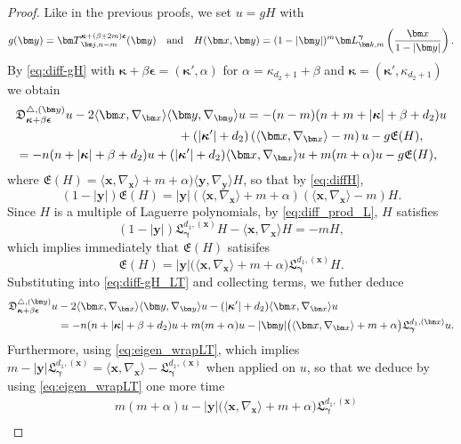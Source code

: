\documentclass{amsart}
\theoremstyle{remark}
\def\la{{\langle}}
\def\ra{{\rangle}}
\def\fD{{\mathfrak D}}
\def\fE{{\mathfrak E}}
\def\fL{{\mathfrak L}}
\def\a{{\alpha}}
\def\b{{\beta}}
\def\k{{\kappa}}
\def\la{{\langle}}
\def\ra{{\rangle}}
\def\xb{{\bm x}}
\def\yb{{\bm y}}
\def\Tb{{\bm T}}
\def\bep{{\boldsymbol{\epsilon}}}
\def\bg{{\boldsymbol{\gamma}}}
\def\bk{{\boldsymbol{\kappa}}}
\begin{document}
\begin{proof}
Like in the previous proofs, we set $u  = g H$ with
$$
  g(\yb) = \Tb_{\bm j, n-m}^{\bk+(\b+2m)\bep}(\bm y) \quad \hbox{and} \quad H(\xb,\yb) =(1- |\bm y|)^m 
      \bm L_{\bm k, m}^{\bg} \left(\frac{\bm x}{1- |\bm y|}\right).
$$
By \eqref{eq:diff-gH} with $\bk+\b \bep = (\bk', \a)$ for $\a = \k_{d_2+1} + \b$ and $\bk = (\bk', \k_{d_2+1})$ we obtain 
\begin{align} \label{eq:diff-gH_LT}
& \fD_{\bk+\b \bep}^{\triangle, (\yb)} u  -  2 \la \bm x, \nabla_{\bm x} \ra  \la \bm y, \nabla_{\bm y} \ra u 
 =  - (n-m) (n+ m + |\bk|+ \b +d_2) u \\
& \qquad \qquad\qquad\qquad\qquad\qquad\quad + (|\bk'|+ d_2)\left (\la \bm x, \nabla_{\bm x} \ra -m\right )u  - g  \fE(H), \notag \\
& =  - n (n + |\bk|+ \b +d_2) u + (|\bk'|+ d_2) \la \bm x, \nabla_{\bm x} \ra u + m(m+\a)u  - g  \fE(H), \notag 
\end{align}
where $\fE(H) = \la \bm x, \nabla_{\bm x} \ra +m + \a) \la \bm y, \nabla_{\bm y} \ra H$, so that by \eqref{eq:diffH},
$$
  (1-|\yb|)\fE(H) = |\yb| (\la \bm x, \nabla_{\bm x} \ra +m + \a) (\la \xb, \nabla_{\bm x} \ra-m)  H.
$$
Since $H$ is a multiple of Laguerre polynomials, by \eqref{eq:diff_prod_L}, $H$ satisfies 
\begin{equation}\label{eq:eigen_wrapLT}
   (1-|\yb|) \fL_\bg^{d_1, (\xb)} H - \la \bm x, \nabla_{\bm x} \ra H = - m H,
\end{equation}
which implies immediately that $\fE(H)$ satisifes 
$$
   \fE(H) = |\yb| \big (\la \bm x, \nabla_{\bm x} \ra +m + \a\big)\fL_\bg^{d_1, (\xb)} H. 
$$
Substituting into \eqref{eq:diff-gH_LT} and collecting terms, we futher deduce 
\begin{align*}
\fD_{\bk+\b \bep}^{\triangle, (\yb)} u  & -  2 \la \bm x, \nabla_{\bm x} \ra   \la \bm y, \nabla_{\bm y} \ra u 
 - (|\bk'|+ d_2) \la \bm x, \nabla_{\bm x} \ra u \\
  & =  - n (n + |\bk|+ \b +d_2) u  + m(m+\a)u  - |\yb| \big (\la \bm x, \nabla_{\bm x} \ra +m + \a\big)\fL_\bg^{d_1, (\xb)} u. \notag
\end{align*}
Furthermore, using \eqref{eq:eigen_wrapLT}, which implies $m - |\yb| \fL_\bg^{d_1, (\xb)} =
   \la \xb, \nabla_\xb\ra - \fL_\bg^{d_1, (\xb)}$ when applied on $u$, so that we deduce by using \eqref{eq:eigen_wrapLT}
one more time
\begin{align*}
  & m(m+\a)u  - |\yb| \big (\la \bm x, \nabla_{\bm x} \ra +m + \a\big)\fL_\bg^{d_1, (\xb)}  \\

\end{align*}
\end{proof}
\end{document}
